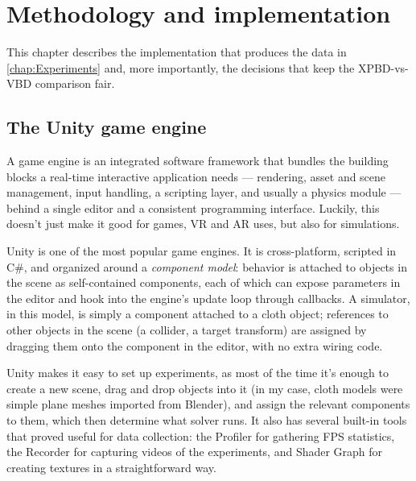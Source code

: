 \chapter{Methodology and implementation}
\label{chap:Methodology}

This chapter describes the implementation that produces the data in
\autoref{chap:Experiments} and, more importantly, the decisions that keep the
XPBD-vs-VBD comparison fair.

\section{The Unity game engine}
\label{sec:Unity}
A game engine is an integrated software framework that bundles the building
blocks a real-time interactive application needs --- rendering, asset and scene
management, input handling, a scripting layer, and usually a physics module ---
behind a single editor and a consistent programming interface. Luckily,
this doesn't just make it good for games, VR and AR uses, but also for simulations.

Unity is one of the most popular game engines. It is cross-platform, scripted in C\#, and organized
around a \emph{component model}: behavior is attached to objects in the scene as
self-contained components, each of which can expose parameters in the editor and
hook into the engine's update loop through callbacks. A
simulator, in this model, is simply a component attached to a cloth object;
references to other objects in the scene (a collider, a target transform) are
assigned by dragging them onto the component in the editor, with no extra wiring
code.

Unity makes it easy to set up experiments, as most of the time it's enough to create a
new scene, drag and drop objects into it (in my case, cloth models were simple plane
meshes imported from Blender), and assign the relevant components to them, which then
determine what solver runs. It also has several built-in tools that proved useful
for data collection: the Profiler for gathering FPS statistics, the Recorder for
capturing videos of the experiments, and Shader Graph for creating textures in a straightforward way.

